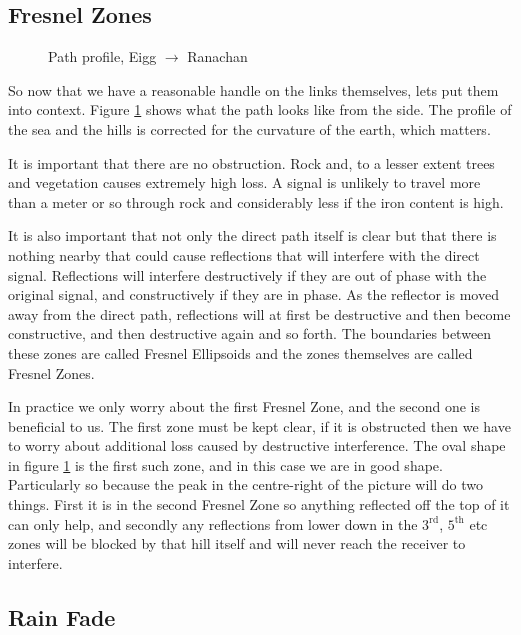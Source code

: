 \subsection{Fresnel Zones}

\begin{figure}[h]
  \begin{center}
    
    \caption{Path profile, Eigg $\rightarrow$ Ranachan}
    \label{fig:EIG_RAN_profile}
  \end{center}
\end{figure}

So now that we have a reasonable handle on the links themselves, lets
put them into context. Figure \ref{fig:EIG_RAN_profile} shows what the
path looks like from the side. The profile of the sea and the hills is
corrected for the curvature of the earth, which matters.

It is important that there are no obstruction. Rock and, to a lesser
extent trees and vegetation causes extremely high loss. A signal is
unlikely to travel more than a meter or so through rock and
considerably less if the iron content is high.

It is also important that not only the direct path itself is clear but
that there is nothing nearby that could cause reflections that will
interfere with the direct signal. Reflections will interfere
destructively if they are out of phase with the original signal, and
constructively if they are in phase. As the reflector is moved away
from the direct path, reflections will at first be destructive and
then become constructive, and then destructive again and so forth. The
boundaries between these zones are called Fresnel Ellipsoids and the
zones themselves are called Fresnel Zones.

In practice we only worry about the first Fresnel Zone, and the second
one is beneficial to us. The first zone must be kept clear, if it is
obstructed then we have to worry about additional loss caused by
destructive interference. The oval shape in figure
\ref{fig:EIG_RAN_profile} is the first such zone, and in this case we
are in good shape. Particularly so because the peak in the
centre-right of the picture will do two things. First it is in the
second Fresnel Zone so anything reflected off the top of it can only
help, and secondly any reflections from lower down in the
$3^\mathrm{rd}$, $5^\mathrm{th}$ etc zones will be blocked by that
hill itself and will never reach the receiver to interfere.

\subsection{Rain Fade}

